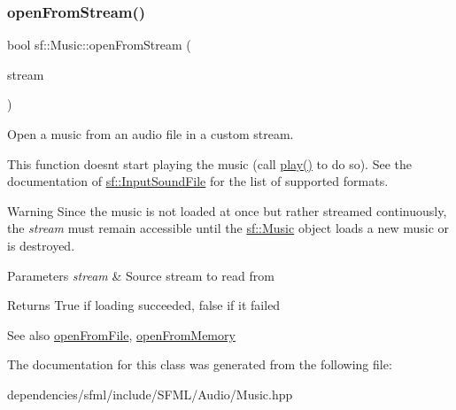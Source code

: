 \subsubsection{\texorpdfstring{open\+From\+Stream()}{openFromStream()}}
{\footnotesize\ttfamily bool sf\+::\+Music\+::open\+From\+Stream (\begin{DoxyParamCaption}\item[{\hyperlink{classsf_1_1_input_stream}{Input\+Stream} \&}]{stream }\end{DoxyParamCaption})}



Open a music from an audio file in a custom stream. 

This function doesn\textquotesingle{}t start playing the music (call \hyperlink{classsf_1_1_sound_stream_afdc08b69cab5f243d9324940a85a1144}{play()} to do so). See the documentation of \hyperlink{classsf_1_1_input_sound_file}{sf\+::\+Input\+Sound\+File} for the list of supported formats.

\begin{DoxyWarning}{Warning}
Since the music is not loaded at once but rather streamed continuously, the {\itshape stream} must remain accessible until the \hyperlink{classsf_1_1_music}{sf\+::\+Music} object loads a new music or is destroyed.
\end{DoxyWarning}

\begin{DoxyParams}{Parameters}
{\em stream} & Source stream to read from\\
\hline
\end{DoxyParams}
\begin{DoxyReturn}{Returns}
True if loading succeeded, false if it failed
\end{DoxyReturn}
\begin{DoxySeeAlso}{See also}
\hyperlink{classsf_1_1_music_a3edc66e5f5b3f11e84b90eaec9c7d7c0}{open\+From\+File}, \hyperlink{classsf_1_1_music_ae93b21bcf28ff0b5fec458039111386e}{open\+From\+Memory} 
\end{DoxySeeAlso}


The documentation for this class was generated from the following file\+:\begin{DoxyCompactItemize}
\item 
dependencies/sfml/include/\+S\+F\+M\+L/\+Audio/Music.\+hpp\end{DoxyCompactItemize}

